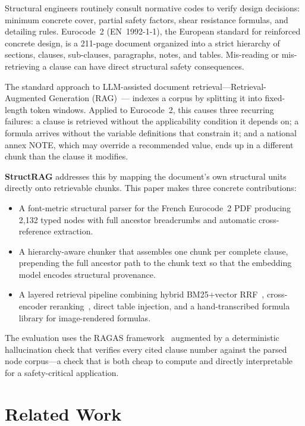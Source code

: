 \documentclass[conference]{IEEEtran}
\begin{document}
Structural engineers routinely consult normative codes to verify design
decisions: minimum concrete cover, partial safety factors, shear
resistance formulas, and detailing rules.
Eurocode~2 (EN~1992-1-1), the European standard for reinforced concrete
design, is a 211-page document organized into a strict hierarchy of
sections, clauses, sub-clauses, paragraphs, notes, and tables.
Mis-reading or mis-retrieving a clause can have direct structural safety
consequences.

The standard approach to LLM-assisted document
retrieval---Retrieval-Augmented Generation (RAG)~\cite{lewis2020rag}---
indexes a corpus by splitting it into fixed-length token windows.
Applied to Eurocode~2, this causes three recurring failures: a clause is
retrieved without the applicability condition it depends on; a formula
arrives without the variable definitions that constrain it; and a
national annex NOTE, which may override a recommended value, ends up
in a different chunk than the clause it modifies.

\textbf{StructRAG} addresses this by mapping the document's own
structural units directly onto retrievable chunks.
This paper makes three concrete contributions:
\begin{itemize}
  \item A font-metric structural parser for the French Eurocode~2 PDF
        producing 2{,}132 typed nodes with full ancestor breadcrumbs
        and automatic cross-reference extraction.
  \item A hierarchy-aware chunker that assembles one chunk per complete
        clause, prepending the full ancestor path to the chunk text so
        that the embedding model encodes structural provenance.
  \item A layered retrieval pipeline combining hybrid BM25+vector
        RRF~\cite{cormack2009rrf}, cross-encoder
        reranking~\cite{nogueira2019passage}, direct table injection,
        and a hand-transcribed formula library for image-rendered
        formulas.
\end{itemize}

The evaluation uses the RAGAS framework~\cite{es2023ragas} augmented by
a deterministic hallucination check that verifies every cited clause
number against the parsed node corpus---a check that is both cheap to
compute and directly interpretable for a safety-critical application.

\section{Related Work}
\label{sec:related}
\end{document}

